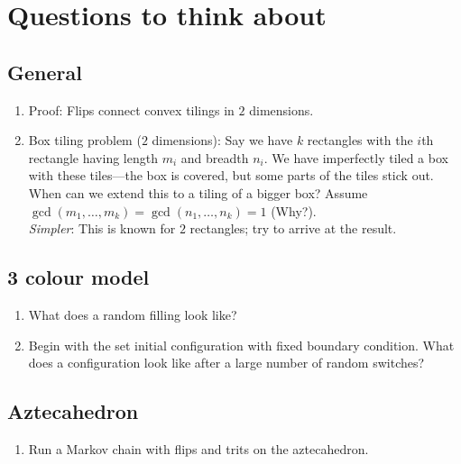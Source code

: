 \chapter{Questions to think about}

\section{General}
\begin{enumerate}
	\item Proof: Flips connect convex tilings in $2$ dimensions.
	\item Box tiling problem ($2$ dimensions): Say we have $k$ rectangles with the $i$th rectangle having length $m_i$ and breadth $n_i$. We have imperfectly tiled a box with these tiles---the box is covered, but some parts of the tiles stick out. When can we extend this to a tiling of a bigger box? Assume $\gcd(m_1,\dots,m_k) = \gcd(n_1,\dots,n_k) = 1$ (Why?).\\ \textit{Simpler}: This is known for $2$ rectangles; try to arrive at the result. 
\end{enumerate}
\section{3 colour model}
\begin{enumerate}
	\item What does a random filling look like?
	\item Begin with the set initial configuration with fixed boundary condition. What does a configuration look like after a large number of random switches?
\end{enumerate}

\section{Aztecahedron}

\begin{enumerate}
	\item Run a Markov chain with flips and trits on the aztecahedron.
\end{enumerate}

